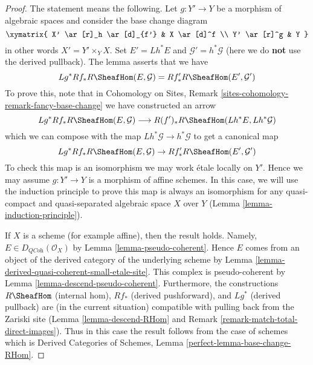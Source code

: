 \begin{proof}
The statement means the following. Let $g : Y' \to Y$ be a morphism of
algebraic spaces and consider the base change diagram
$$
\xymatrix{
X' \ar[r]_h \ar[d]_{f'} &
X \ar[d]^f \\
Y' \ar[r]^g &
Y
}
$$
in other words $X' = Y' \times_Y X$. Set $E' = Lh^*E$ and
$\mathcal{G}' = h^*\mathcal{G}$ (here we do {\bf not} use the derived
pullback). The lemma asserts that we have
$$
Lg^*Rf_*R\SheafHom(E, \mathcal{G}) = Rf'_*R\SheafHom(E', \mathcal{G}')
$$
To prove this, note that in
Cohomology on Sites, Remark \ref{sites-cohomology-remark-fancy-base-change}
we have constructed an arrow
$$
Lg^*Rf_*R\SheafHom(E, \mathcal{G})
\longrightarrow
R(f')_*R\SheafHom(Lh^*E, Lh^*\mathcal{G})
$$
which we can compose with the map $Lh^*\mathcal{G} \to h^*\mathcal{G}$
to get a canonical map
$$
Lg^*Rf_*R\SheafHom(E, \mathcal{G}) \to Rf'_*R\SheafHom(E', \mathcal{G}')
$$
To check this map is an isomorphism we may work \'etale locally on $Y'$.
Hence we may assume $g : Y' \to Y$ is a morphism of affine schemes.
In this case, we will use the induction principle to prove this map
is always an isomorphism for any quasi-compact and quasi-separated
algebraic space $X$ over $Y$ (Lemma
\ref{lemma-induction-principle}).

\medskip\noindent
If $X$ is a scheme (for example affine), then the result holds.
Namely, $E \in D_{\textit{QCoh}}(\mathcal{O}_X)$ by
Lemma \ref{lemma-pseudo-coherent}.
Hence $E$ comes from an object of the derived category of the
underlying scheme by Lemma \ref{lemma-derived-quasi-coherent-small-etale-site}.
This complex is pseudo-coherent by Lemma \ref{lemma-descend-pseudo-coherent}.
Furthermore, the constructions $R\SheafHom$ (internal hom),
$Rf_*$ (derived pushforward), and $Lg^*$ (derived pullback)
are (in the current situation) compatible with pulling back
from the Zariski site
(Lemma \ref{lemma-descend-RHom} and
Remark \ref{remark-match-total-direct-images}).
Thus in this case the result follows from the case of schemes which is
Derived Categories of Schemes, Lemma \ref{perfect-lemma-base-change-RHom}.


\end{proof}
